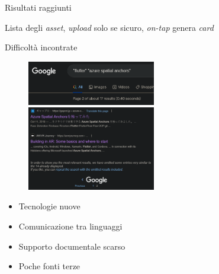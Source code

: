 \documentclass{beamer}
\begin{document}
\begin{frame}{Risultati raggiunti}
\begin{figure}[H]
\end{figure}    
\centering
Lista degli \textit{asset}, \textit{upload} solo se sicuro,
\textit{on-tap} genera \textit{card}

\end{frame}


\begin{frame}{Difficoltà incontrate}
 \begin{figure}
    \centering
    \includegraphics[width=0.5\textwidth]{immagini/asa_flutter_google_search_crop.png}\vspace{0.5em}
    \includegraphics[width=0.5\textwidth]{immagini/asa_flutter_search_today.png}
\end{figure}
\phantom{a}
\begin{itemize}
    \item Tecnologie nuove \vspace{1em}
    \item Comunicazione tra linguaggi \vspace{1em}
    \item Supporto documentale scarso \vspace{1em}
    \item Poche fonti terze
\end{itemize}
\vspace{4em}
\end{frame}

\end{document}
